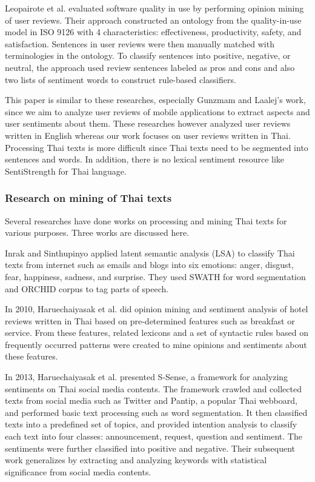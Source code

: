Leopairote et al. \cite{leopairote2} evaluated software quality in use by performing opinion mining of user reviews. Their approach constructed an ontology from the quality-in-use model in ISO 9126 with 4 characteristics: effectiveness, productivity, safety, and satisfaction. Sentences in user reviews were then manually matched with terminologies in the ontology. To classify sentences into positive, negative, or neutral, the approach used review sentences labeled as pros and cons and also two lists of sentiment words to construct rule-based classifiers.

This paper is similar to these researches, especially Gunzmam and Laalej's work, since we aim to analyze user reviews of mobile applications to extract aspects and user sentiments about them. These researches however analyzed user reviews written in English whereas our work focuses on user reviews written in Thai. Processing Thai texts is more difficult since Thai texts need to be segmented into sentences and words. In addition, there is no lexical sentiment resource like SentiStrength for Thai language. 

\subsubsection{Research on mining of Thai texts} Several researches have done works on processing and mining Thai texts for various purposes. Three works are discussed here.

Inrak and Sinthupinyo \cite{emotioninthai} applied latent semantic analysis (LSA) \cite{LSA} to classify Thai texts from internet such as emails and blogs into six emotions: anger, disgust, fear, happiness, sadness, and surprise. They used SWATH \cite{SWATH} for word segmentation and ORCHID \cite{ORCHID} corpus to tag parts of speech.

In 2010, Haruechaiyasak et al. \cite{thaiopinionmininghotel} did opinion mining and sentiment analysis of hotel reviews written in Thai based on pre-determined features such as breakfast or service. From these features, related lexicons and a set of syntactic rules based on frequently occurred patterns were created to mine opinions and sentiments about these features.

In 2013, Haruechaiyasak et al. \cite{ssense} presented S-Sense, a framework for analyzing sentiments on Thai social media contents. The framework crawled and collected texts from social media such as Twitter and Pantip, a popular Thai webboard, and performed basic text processing such as word segmentation. It then classified texts into a predefined set of topics, and provided intention analysis to classify each text into four classes: announcement, request, question and sentiment. The sentiments were further classified into positive and negative. Their subsequent work \cite{ssense2} generalizes by extracting and analyzing keywords with statistical significance from social media contents.


